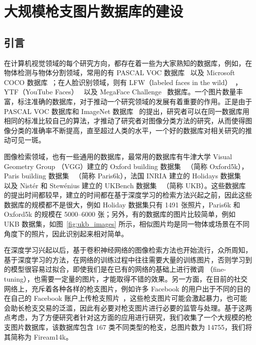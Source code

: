 
\chapter{大规模枪支图片数据库的建设}\label{chapter:firearm_dataset}
\section{引言}
在计算机视觉领域的每个研究方向，都存在着一些为大家熟知的数据库，例如，在物体检测与物体分割领域，常用的有 PASCAL VOC 数据库~\cite{Everingham2014ThePV}  以及 Microsoft COCO 数据库~\cite{Lin2014MicrosoftCC}；在人脸识别领域，则有 LFW（labeled faces in the wild）~\cite{LFWTech}，YTF（YouTube Faces）~\cite{Wolf2011FaceRI} 以及 MegaFace Challenge~\cite{kemelmacher2016megaface}  数据库。一个图片数量丰富，标注准确的数据库，对于推动一个研究领域的发展有着重要的作用。正是由于 PASCAL VOC 数据库和 ImageNet 数据库~\cite{Russakovsky2015ImageNetLS} 的提出，研究者可以在同一数据库用相同的标准比较自己的算法，才推动了研究者对图像分类方法的研究，从而使得图像分类的准确率不断提高，直至超过人类的水平，一个好的数据库对相关研究的推动可见一斑。

图像检索领域，也有一些通用的数据库，最常用的数据库有牛津大学 Visual Geometry Group （VGG）建立的 Oxford building 数据集~\cite{Philbin2007ObjectRW} （简称 Oxford5k），Paris building 数据集~\cite{Philbin2008LostIQ} （简称 Paris6k），法国 INRIA 建立的 Holidays 数据集~\cite{Jgou2008HammingEA} 以及 Nist{\'e}r 和 Stew{\'e}nius 建立的 UKBench 数据集~\cite{Nistr2006ScalableRW} （简称 UKB）。这些数据库的提出时间都较早，建立的时间都在基于深度学习的检索方法兴起之前，因此这些数据库的规模都不是很大，例如 Holiday 数据集只有 1491 张照片，Paris6k 和 Oxford5k 的规模在 5000--6000 张；另外，有的数据库的图片比较简单，例如 UKB 数据集，如图~\ref{fig:ukb_images} 所示，相似图片均是同一物体或场景在不同角度下的照片，因此识别起来相对简单。

在深度学习兴起以后，基于卷积神经网络的图像检索方法也开始流行，众所周知，基于深度学习的方法，在网络的训练过程中往往需要大量的训练图片，否则学习到的模型很容易过拟合，即使我们是在已有的网络的基础上进行微调 （fine-tuning），也需要一定量的图片，才能取得不错的效果。另一方面，在目前的社交网络上，充斥着各种各样的枪支图片，例如许多 Facebook 的用户出于不同的目的在自己的 Facebook 账户上传枪支照片~\cite{Drange2016}，这些枪支图片可能会激起暴力，也可能会助长枪支交易的泛滥，因此有必要对枪支图片进行必要的监管与处理。基于这两点考虑，为了方便研究者针对这方面的应用进行研究，我们收集了一个大规模的枪支图片数据库，该数据库包含 167 类不同类型的枪支，总图片数为 14755，我们将其简称为 Fiream14k。


